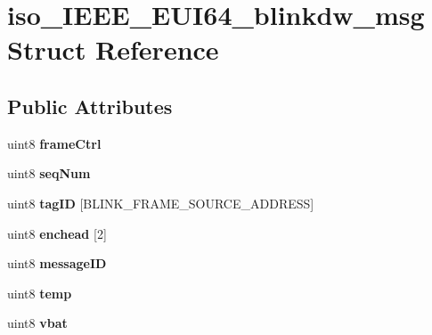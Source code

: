 \hypertarget{structiso__IEEE__EUI64__blinkdw__msg}{\section{iso\-\_\-\-I\-E\-E\-E\-\_\-\-E\-U\-I64\-\_\-blinkdw\-\_\-msg Struct Reference}
\label{structiso__IEEE__EUI64__blinkdw__msg}
}
\subsection*{Public Attributes}
\begin{DoxyCompactItemize}
\item 
\hypertarget{structiso__IEEE__EUI64__blinkdw__msg_a048d0a556990a1ccf2003fa91c9ada07}{uint8 {\bfseries frame\-Ctrl}}\label{structiso__IEEE__EUI64__blinkdw__msg_a048d0a556990a1ccf2003fa91c9ada07}

\item 
\hypertarget{structiso__IEEE__EUI64__blinkdw__msg_ad1c7162ff26c032bd4a40dc8b6254422}{uint8 {\bfseries seq\-Num}}\label{structiso__IEEE__EUI64__blinkdw__msg_ad1c7162ff26c032bd4a40dc8b6254422}

\item 
\hypertarget{structiso__IEEE__EUI64__blinkdw__msg_aa1b8870273036bf2a5042ea2881a0c17}{uint8 {\bfseries tag\-I\-D} \mbox{[}B\-L\-I\-N\-K\-\_\-\-F\-R\-A\-M\-E\-\_\-\-S\-O\-U\-R\-C\-E\-\_\-\-A\-D\-D\-R\-E\-S\-S\mbox{]}}\label{structiso__IEEE__EUI64__blinkdw__msg_aa1b8870273036bf2a5042ea2881a0c17}

\item 
\hypertarget{structiso__IEEE__EUI64__blinkdw__msg_a9b87975cd8ae822908e736cfcea84e29}{uint8 {\bfseries enchead} \mbox{[}2\mbox{]}}\label{structiso__IEEE__EUI64__blinkdw__msg_a9b87975cd8ae822908e736cfcea84e29}

\item 
\hypertarget{structiso__IEEE__EUI64__blinkdw__msg_a167f34a4cd311c4bee5d16ff667bf8be}{uint8 {\bfseries message\-I\-D}}\label{structiso__IEEE__EUI64__blinkdw__msg_a167f34a4cd311c4bee5d16ff667bf8be}

\item 
\hypertarget{structiso__IEEE__EUI64__blinkdw__msg_aab9e74f542a1f56223c5d60e5e94ea12}{uint8 {\bfseries temp}}\label{structiso__IEEE__EUI64__blinkdw__msg_aab9e74f542a1f56223c5d60e5e94ea12}

\item 
\hypertarget{structiso__IEEE__EUI64__blinkdw__msg_a4b4827a6066b5d41d8e5a8443547c28c}{uint8 {\bfseries vbat}}\label{structiso__IEEE__EUI64__blinkdw__msg_a4b4827a6066b5d41d8e5a8443547c28c}


\end{DoxyCompactItemize}
